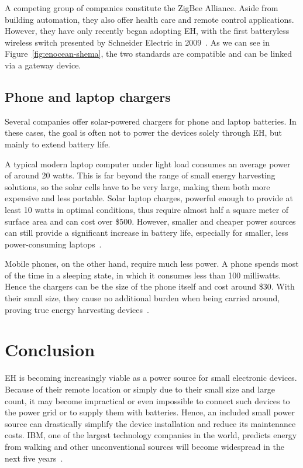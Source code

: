 \documentclass[a4paper,10pt]{article}
\begin{document}
A competing group of companies constitute the ZigBee Alliance. Aside from building automation, they also offer health care and remote control applications. However, they have only recently began adopting \ac{EH}, with the first batteryless wireless switch presented by Schneider Electric in 2009~\cite{schneider-zb}. As we can see in Figure~\ref{fig:enocean-shema}, the two standards are compatible and can be linked via a gateway device. 

\newpage
\subsection{Phone and laptop chargers}

Several companies offer solar-powered chargers for phone and laptop batteries. In these cases, the goal is often not to power the devices solely through \ac{EH}, but mainly to extend battery life. 

A typical modern laptop computer under light load consumes an average power of around 20 watts. This is far beyond the range of small energy harvesting solutions, so the solar cells have to be very large, making them both more expensive and less portable. Solar laptop charges, powerful enough to provide at least 10 watts in optimal conditions, thus require almost half a square meter of surface area and can cost over \$500. However, smaller and cheaper power sources can still provide a significant increase in battery life, especially for smaller, less power-consuming laptops~\cite{news:laptop-chargers}. 

Mobile phones, on the other hand, require much less power. A phone spends most of the time in a sleeping state, in which it consumes less than 100 milliwatts. Hence the chargers can be the size of the phone itself and cost around \$30. With their small size, they cause no additional burden when being carried around, proving true energy harvesting devices~\cite{mysolarphonecharger}. 


\section{Conclusion}

\acf{EH} is becoming increasingly viable as a power source for small electronic devices. Because of their remote location or simply due to their small size and large count, it may become impractical or even impossible to connect such devices to the power grid or to supply them with batteries. Hence, an included small power source can drastically simplify the device installation and reduce its maintenance costs. \acs{IBM}, one of the largest technology companies in the world, predicts energy from walking and other unconventional sources will become widespread in the next five years~\cite{ibm:5in5}. 
\end{document}
